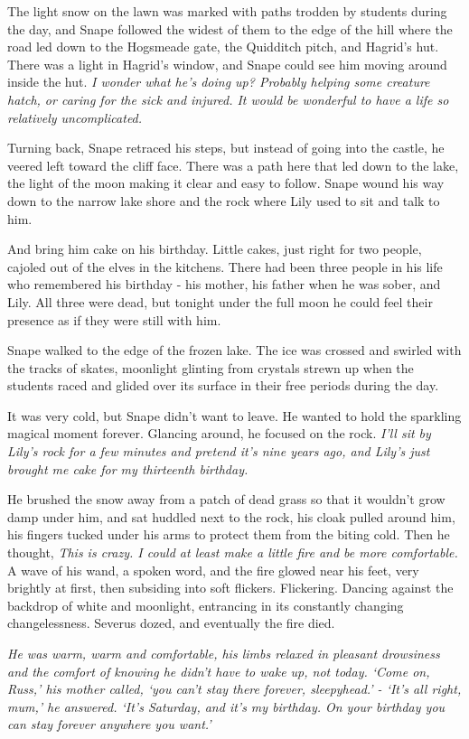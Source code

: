 The light snow on the lawn was marked with paths trodden by students during the day, and Snape followed the widest of them to the edge of the hill where the road led down to the Hogsmeade gate, the Quidditch pitch, and Hagrid's hut. There was a light in Hagrid's window, and Snape could see him moving around inside the hut. \emph{I wonder what he's doing up? Probably helping some creature hatch, or caring for the sick and injured. It would be wonderful to have a life so relatively uncomplicated.}

Turning back, Snape retraced his steps, but instead of going into the castle, he veered left toward the cliff face. There was a path here that led down to the lake, the light of the moon making it clear and easy to follow. Snape wound his way down to the narrow lake shore and the rock where Lily used to sit and talk to him.

And bring him cake on his birthday. Little cakes, just right for two people, cajoled out of the elves in the kitchens. There had been three people in his life who remembered his birthday - his mother, his father when he was sober, and Lily. All three were dead, but tonight under the full moon he could feel their presence as if they were still with him.

Snape walked to the edge of the frozen lake. The ice was crossed and swirled with the tracks of skates, moonlight glinting from crystals strewn up when the students raced and glided over its surface in their free periods during the day.

It was very cold, but Snape didn't want to leave. He wanted to hold the sparkling magical moment forever. Glancing around, he focused on the rock. \emph{I'll sit by Lily's rock for a few minutes and pretend it's nine years ago, and Lily's just brought me cake for my thirteenth birthday.}

He brushed the snow away from a patch of dead grass so that it wouldn't grow damp under him, and sat huddled next to the rock, his cloak pulled around him, his fingers tucked under his arms to protect them from the biting cold. Then he thought, \emph{This is crazy. I could at least make a little fire and be more comfortable.} A wave of his wand, a spoken word, and the fire glowed near his feet, very brightly at first, then subsiding into soft flickers. Flickering. Dancing against the backdrop of white and moonlight, entrancing in its constantly changing changelessness. Severus dozed, and eventually the fire died.

\emph{He was warm, warm and comfortable, his limbs relaxed in pleasant drowsiness and the comfort of knowing he didn't have to wake up, not today. `Come on, Russ,' his mother called, `you can't stay there forever, sleepyhead.' - `It's all right, mum,' he answered. `It's Saturday, and it's my birthday. On your birthday you can stay forever anywhere you want.'}

